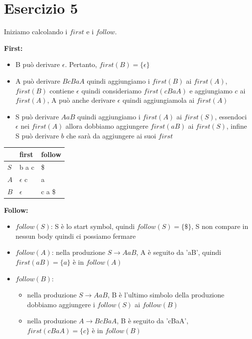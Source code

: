 \documentclass[11pt]{article}
\begin{document}
\section*{Esercizio 5}
Iniziamo calcolando i $first$ e i $follow$.
\begin{multicols}{2}
\noindent\textbf{First:}
\begin{itemize}
  \item B può derivare $\epsilon$. Pertanto, $first(B) = \{\epsilon\}$
  \item A può derivare $BcBaA$ quindi aggiungiamo i $first(B)$ ai $first(A)$, $first(B)$ contiene $\epsilon$
  quindi consideriamo $first(cBaA)$ e aggiungiamo $c$ ai $first(A)$,
  A può anche derivare $\epsilon$ quindi aggiungiamola ai $first(A)$
  \item S può derivare $AaB$ quindi aggiungiamo i $first(A)$ ai $first(S)$,
  essendoci $\epsilon$ nei $first(A)$ allora dobbiamo aggiungere $first(aB)$ ai $first(S)$, infine S può derivare $b$ che sarà da aggiungere ai suoi $first$ 
\end{itemize}
\begin{table}[H]  
  \centering
  \begin{tabularx}{\linewidth}{|>{\centering\arraybackslash}X|>{\centering\arraybackslash}X|>{\centering\arraybackslash}X|}
    \hline
    & first & follow  \\
    \hline
    $S$ & b a c & \$ \\
    \hline
    $A$ & $\epsilon$ c & a \\
    \hline
    $B$ & $\epsilon$ & c a \$ \\
    \hline
  \end{tabularx}
  \label{tab:05-first-follow}
\end{table}
\textbf{Follow:} 
\begin{itemize}
  \item $follow(S)$: S è lo start symbol, quindi $follow(S) = \{\$\}$, S non compare in nessun body quindi ci possiamo fermare
  \item $follow(A)$: nella produzione $S \to AaB$, A è seguito da 'aB', quindi $first(aB) = \{a\}$ è in $follow(A)$
  \item $follow(B)$:
  \begin{itemize}
    \item nella produzione $S \to AaB$, B è l'ultimo simbolo della produzione dobbiamo aggiungere i $follow(S)$ ai $follow(B)$
    \item nella produzione $A \to BcBaA$, B è seguito da 'cBaA', $first(cBaA) = \{c\}$ è in $follow(B)$
  \end{itemize} 
\end{itemize}
\end{multicols}
\end{document}
